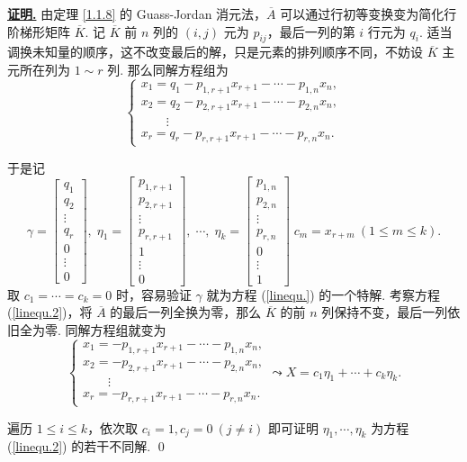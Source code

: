 \documentclass[10pt,openany]{article}
\theoremstyle{thmstyle} %
\theoremstyle{defstyle} %
\theoremstyle{prostyle} %
\theoremstyle{exastyle}
\theoremstyle{remstyle}
\renewenvironment{proof}[1][证明]{\par\underline{\textbf{#1.}} \;\fangsong}{\qed\par}
\begin{document}
\begin{proof}
	由定理 \ref{1.1.8} 的 Guass-Jordan 消元法，\( \overline{A} \) 可以通过行初等变换变为简化行阶梯形矩阵 \( \overline{K} \). 记 \( \overline{K} \) 前 \( n \) 列的 \( (i,j) \) 元为 \( p_{ij} \)，最后一列的第 \( i \) 行元为 \( q_i \). 适当调换未知量的顺序，这不改变最后的解，只是元素的排列顺序不同，不妨设 \( \overline{K} \) 主元所在列为 \( 1 \sim r \) 列. 那么同解方程组为
	\[ \left\{ \begin{array}{l}
		x_1= q_1-p_{1,r+1}x_{r+1}-\cdots-p_{1,n}x_n, \\
		x_2= q_2-p_{2,r+1}x_{r+1}-\cdots-p_{2,n}x_n, \\
		\qquad \vdots \\
		x_r= q_r-p_{r,r+1}x_{r+1}-\cdots-p_{r,n}x_n. 
	\end{array}\right. \]
	
	于是记
	\[ \gamma=\begin{bmatrix}
		q_1 \\ q_2 \\ \vdots \\ q_r \\ 0  \\ \vdots \\ 0
	\end{bmatrix},\; \eta_1=\begin{bmatrix}
	p_{1,r+1} \\ p_{2,r+1} \\ \vdots \\ p_{r,r+1} \\ 1 \\ \vdots \\ 0
	\end{bmatrix}, \; \cdots, \; \eta_k=\begin{bmatrix}
	p_{1,n} \\ p_{2,n} \\ \vdots \\ p_{r,n} \\ 0 \\ \vdots \\ 1
	\end{bmatrix}  \; c_{m}=x_{r+m} \ ( 1 \leq m \leq k). \]
	取 \( c_1=\cdots=c_k=0 \) 时，容易验证 \( \gamma \) 就为方程 (\ref{linequ.}) 的一个特解. 考察方程 (\ref{linequ.2})，将 \( \overline{A} \) 的最后一列全换为零，那么 \( \overline{K} \) 的前 \( n \) 列保持不变，最后一列依旧全为零. 同解方程组就变为
	\[ \left\{ \begin{array}{l}
		x_1= -p_{1,r+1}x_{r+1}-\cdots-p_{1,n}x_n, \\
		x_2= -p_{2,r+1}x_{r+1}-\cdots-p_{2,n}x_n, \\
		\qquad \vdots \\
		x_r= -p_{r,r+1}x_{r+1}-\cdots-p_{r,n}x_n. 
	\end{array}\right. \leadsto X=c_1\eta_1+\cdots+c_k\eta_k. \]
	
    遍历 \( 1 \leq i \leq k \)，依次取 \( c_i=1, c_j=0 \ (j \neq i) \) 即可证明 \( \eta_1,\cdots,\eta_k \) 为方程 (\ref{linequ.2}) 的若干不同解.
\end{proof}
\end{document}
